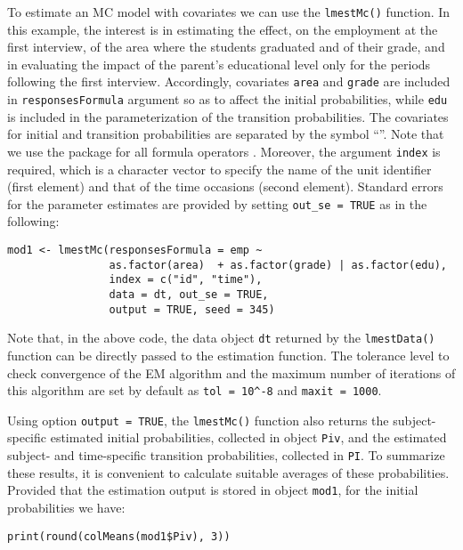 To estimate an MC model with covariates we can use the \texttt{lmestMc()}
function. In this example, the interest is in estimating the effect, on
the employment at the first interview, of the area where the students
graduated and of their grade, and in evaluating the impact of the
parent's educational level only for the periods following the first
interview. Accordingly, covariates \texttt{area} and \texttt{grade} are included in
\texttt{responsesFormula} argument so as to affect the initial probabilities,
while \texttt{edu} is included in the parameterization of the transition
probabilities. The covariates for initial and transition probabilities
are separated by the symbol ``\texttt{\textbar{}}''. Note that we use the
 package for all formula operators
\citep{zeil:croi:10}. Moreover, the argument \texttt{index} is required, which
is a character vector to specify the name of the unit identifier (first
element) and that of the time occasions (second element). Standard
errors for the parameter estimates are provided by setting
\texttt{out\_se\ =\ TRUE} as in the following:

\begin{verbatim}
mod1 <- lmestMc(responsesFormula = emp ~
                as.factor(area)  + as.factor(grade) | as.factor(edu),
                index = c("id", "time"),
                data = dt, out_se = TRUE, 
                output = TRUE, seed = 345)
\end{verbatim}

Note that, in the above code, the data object \texttt{dt} returned by the
\texttt{lmestData()} function can be directly passed to the estimation
function. The tolerance level to check convergence of the EM algorithm
and the maximum number of iterations of this algorithm are set by
default as \texttt{tol\ =\ 10\^{}-8} and \texttt{maxit\ =\ 1000}.

Using option \texttt{output\ =\ TRUE}, the \texttt{lmestMc()} function also returns the
subject-specific estimated initial probabilities, collected in object
\texttt{Piv}, and the estimated subject- and time-specific transition
probabilities, collected in \texttt{PI}. To summarize these results, it is
convenient to calculate suitable averages of these probabilities.
Provided that the estimation output is stored in object \texttt{mod1}, for the
initial probabilities we have:

\begin{verbatim}
print(round(colMeans(mod1$Piv), 3))
\end{verbatim}

